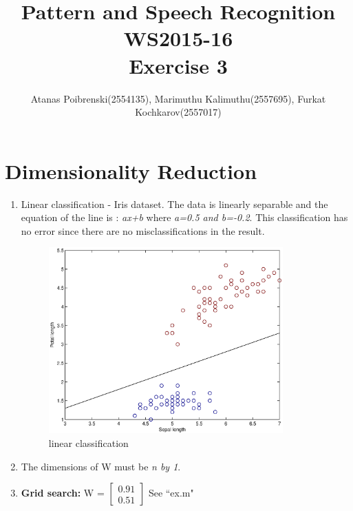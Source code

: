 \documentclass[a4paper]{article}
\title{Pattern and Speech Recognition WS2015-16 \\ Exercise 3}
\author{Atanas Poibrenski(2554135), Marimuthu Kalimuthu(2557695), Furkat Kochkarov(2557017)}
\begin{document}
\maketitle
\section*{Dimensionality Reduction}

\begin{enumerate}
	\item Linear classification - Iris dataset. \newline
	The data is linearly separable and the equation of the line is : \newline
	\textit{ax+b} where \textit{a=0.5 and b=-0.2}. \newline \newline
	This classification has no error since there are no misclassifications in the result. \newline
	
	\begin{figure}[H]
		\begin{center}
			\includegraphics[width=0.85\textwidth]{Ex1.eps}
			\caption{linear classification}\label{fig:linclass}		
		\end{center}
	\end{figure}
	
\item The dimensions of W must be \textit{n by 1}. \newline \newline

\item \textbf{Grid search:} \newline \newline
 W = $\begin{bmatrix}
 	0.91 \\
 	0.51 
 \end{bmatrix}
 $ \newline \newline
See ``ex.m"


\end{enumerate}
\end{document}
